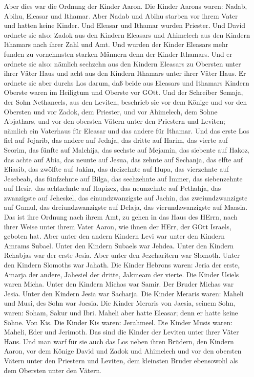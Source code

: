  Aber dies war die Ordnung der Kinder Aaron. Die Kinder
Aarons waren: Nadab, Abihu, Eleasar und Ithamar.  Aber Nadab
und Abihu starben vor ihrem Vater und hatten keine Kinder. Und Eleasar
und Ithamar wurden Priester.  Und David ordnete sie also:
Zadok aus den Kindern Eleasars und Ahimelech aus den Kindern Ithamars
nach ihrer Zahl und Amt.  Und wurden der Kinder Eleasars
mehr funden zu vornehmsten starken Männern denn der Kinder Ithamars. Und
er ordnete sie also: nämlich sechzehn aus den Kindern Eleasars zu
Obersten unter ihrer Väter Haus und acht aus den Kindern Ithamars unter
ihrer Väter Haus.  Er ordnete sie aber durchs Los darum, daß
beide aus Eleasars und Ithamars Kindern Oberste waren im Heiligtum und
Oberste vor GOtt.  Und der Schreiber Semaja, der Sohn
Nethaneels, aus den Leviten, beschrieb sie vor dem Könige und vor den
Obersten und vor Zadok, dem Priester, und vor Ahimelech, dem Sohne
Abjathars, und vor den obersten Vätern unter den Priestern und Leviten;
nämlich ein Vaterhaus für Eleasar und das andere für Ithamar.
 Und das erste Los fiel auf Jojarib, das andere auf Jedaja,
 das dritte auf Harim, das vierte auf Seorim, 
das fünfte auf Malchija, das sechste auf Mejamin,  das
siebente auf Hakoz, das achte auf Abia,  das neunte auf
Jesua, das zehnte auf Sechanja,  das elfte auf Eliasib, das
zwölfte auf Jakim,  das dreizehnte auf Hupa, das vierzehnte
auf Jesebeab,  das fünfzehnte auf Bilga, das sechzehnte auf
Immer,  das siebenzehnte auf Hesir, das achtzehnte auf
Hapizez,  das neunzehnte auf Pethahja, das zwanzigste auf
Jeheskel,  das einundzwanzigste auf Jachin, das
zweiundzwanzigste auf Gamul,  das dreiundzwanzigste auf
Delaja, das vierundzwanzigste auf Maasia.  Das ist ihre
Ordnung nach ihrem Amt, zu gehen in das Haus des HErrn, nach ihrer Weise
unter ihrem Vater Aaron, wie ihnen der HErr, der GOtt Israels, geboten
hat.  Aber unter den andern Kindern Levi war unter den
Kindern Amrams Subael. Unter den Kindern Subaels war Jehdea.
 Unter den Kindern Rehabjas war der erste Jesia.
 Aber unter den Jezeharitern war Slomoth. Unter den Kindern
Slomoths war Jahath.  Die Kinder Hebrons waren: Jeria der
erste, Amarja der andere, Jahesiel der dritte, Jakmeam der vierte.
 Die Kinder Usiels waren Micha. Unter den Kindern Michas
war Samir.  Der Bruder Michas war Jesia. Unter den Kindern
Jesia war Sacharja.  Die Kinder Meraris waren: Maheli und
Musi, des Sohn war Jaesia.  Die Kinder Meraris von Jaesia,
seinem Sohn, waren: Soham, Sakur und Ibri.  Maheli aber
hatte Eleasar; denn er hatte keine Söhne.  Von Kis. Die
Kinder Kis waren: Jerahmeel.  Die Kinder Musis waren:
Maheli, Eder und Jerimoth. Das sind die Kinder der Leviten unter ihrer
Väter Haus.  Und man warf für sie auch das Los neben ihren
Brüdern, den Kindern Aaron, vor dem Könige David und Zadok und Ahimelech
und vor den obersten Vätern unter den Priestern und Leviten, dem
kleinsten Bruder ebensowohl als dem Obersten unter den Vätern.

